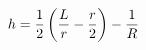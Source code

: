 \documentclass[preview]{standalone}
\begin{document}
\begin{align*}
h = \frac{1}{2}\left({ L \over r}-\frac{r}{2}\right)-\frac{1}{R}
\end{align*}
\end{document}
